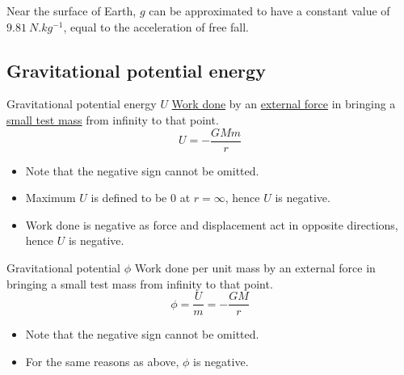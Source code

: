 Near the surface of Earth, $g$ can be approximated to have a constant value of $9.81\:\unit{N.kg^{-1}}$, equal to the acceleration of free fall.
\pagebreak

\subsection{Gravitational potential energy}
\begin{defn}{Gravitational potential energy $U$}{}
\underline{Work done} by an \underline{external force} in bringing a \underline{small test mass} from infinity to that point.
\begin{equation} U = -\frac{GMm}{r} \end{equation}
\end{defn}

\begin{itemize}
\item Note that the negative sign cannot be omitted.
\item Maximum $U$ is defined to be 0 at $r=\infty$, hence $U$ is negative.
\item Work done is negative as force and displacement act in opposite directions, hence $U$ is negative.
\end{itemize}

\begin{defn}{Gravitational potential $\phi$}{}
Work done per unit mass by an external force in bringing a small test mass from infinity to that point.
\begin{equation} \phi = \frac{U}{m} = -\frac{GM}{r} \end{equation}
\end{defn}

\begin{itemize}
\item Note that the negative sign cannot be omitted.
\item For the same reasons as above, $\phi$ is negative.
\end{itemize}
\pagebreak

